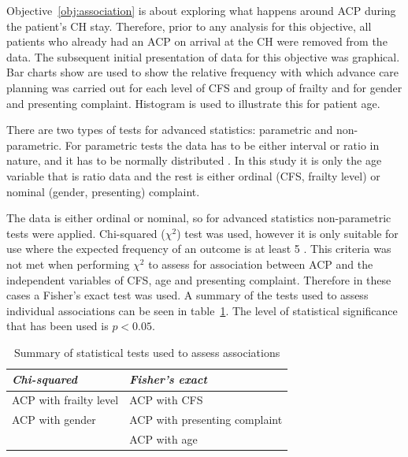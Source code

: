 \documentclass
[
	12pt,
	a4paper,
	oneside,
]{report}
\begin{document}
Objective~\ref{obj:association} is about exploring what happens around ACP
during the patient's CH stay. Therefore, prior to any analysis for this 
objective, all patients who already had an ACP on arrival at the CH were
removed from the data.
The subsequent initial presentation of data for this objective was
graphical. Bar charts show are used to show the relative frequency with which 
advance care planning
was carried out for each level of CFS and group of frailty and for gender and
presenting complaint. Histogram is used to illustrate this for patient age.

There are two types of tests for advanced statistics: parametric and
non-parametric. For parametric tests the data has to be either interval or
ratio in nature, and it has to be normally distributed \parencite{parahoo:14}.
In this study it is only the age variable that is ratio data and the rest is 
either ordinal
(CFS, frailty level) or nominal (gender, presenting) complaint.



The data is either ordinal or nominal, so for advanced statistics
non-parametric tests were applied. Chi-squared ($\chi^2$) test was used, 
however it is only
suitable for use where the expected frequency of an outcome is at least 5
\parencite[page 690]{field:09}. This criteria was not met when performing 
$\chi^2$ to assess for association between ACP and the independent variables 
of CFS, age and presenting complaint. Therefore in these cases a Fisher's exact
test was used. A summary of the tests used to assess individual associations
can be seen in table~\ref{tab:stat-tests}. 
The level of statistical significance that has been used is
$p<0.05$.

\begin{table}[ht]
\caption{Summary of statistical tests used to assess associations}
\label{tab:stat-tests}
\begin{tabular}{ l l }
\emph{Chi-squared} & \emph{Fisher's exact} \\
\hline
ACP with frailty level & ACP with CFS \\
ACP with gender & ACP with presenting complaint \\
 & ACP with age
\end{tabular}
\end{table}

%
%
\end{document}
